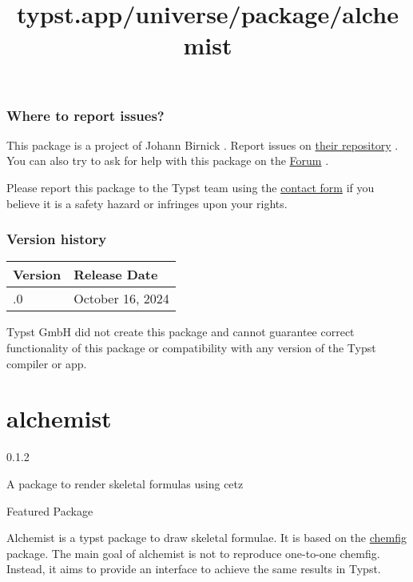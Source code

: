 \subsubsection{Where to report issues?}\label{where-to-report-issues}

This package is a project of Johann Birnick . Report issues on
\href{https://github.com/jbirnick/typst-headcount}{their repository} .
You can also try to ask for help with this package on the
\href{https://forum.typst.app}{Forum} .

Please report this package to the Typst team using the
\href{https://typst.app/contact}{contact form} if you believe it is a
safety hazard or infringes upon your rights.

\label{versions}
\subsubsection{Version history}\label{version-history}

\begin{longtable}[]{@{}ll@{}}
\toprule\noalign{}
Version & Release Date \\
\midrule\noalign{}
\endhead
\bottomrule\noalign{}
\endlastfoot
0.1.0 & October 16, 2024 \\
\end{longtable}

Typst GmbH did not create this package and cannot guarantee correct
functionality of this package or compatibility with any version of the
Typst compiler or app.


\title{typst.app/universe/package/alchemist}

\label{banner}
\section{alchemist}\label{alchemist}

{ 0.1.2 }

A package to render skeletal formulas using cetz

{ } Featured Package

\label{readme}
Alchemist is a typst package to draw skeletal formulae. It is based on
the \href{https://ctan.org/pkg/chemfig}{chemfig} package. The main goal
of alchemist is not to reproduce one-to-one chemfig. Instead, it aims to
provide an interface to achieve the same results in Typst.

